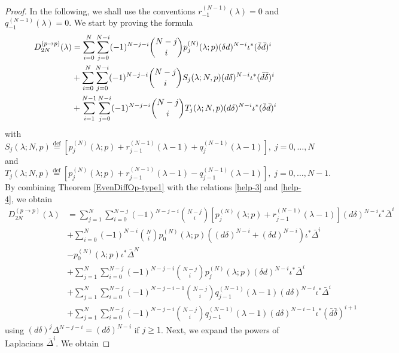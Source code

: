 \documentclass[a4paper,12pt,reqno]{amsart}
\numberwithin{theorem}{subsection}
\numberwithin{equation}{section}
\begin{document}
\begin{proof} In the following, we shall use the conventions $r_{-1}^{(N-1)}(\lambda) = 0$ and
$q_{-1}^{(N-1)}(\lambda)=0$. We start by proving the formula
\begin{align}\label{even-prep}
   D_{2N}^{(p \to p)}(\lambda) & = \sum_{i=0}^{N} \sum_{j=0}^{N-i} (-1)^{N-j-i} \binom{N-j}{i}
   p_j^{(N)}(\lambda;p) (\delta{d})^{N-i} \iota^* (\bar{\delta}\bar{d})^i \notag \\
   & + \sum_{i=0}^{N} \sum_{j=0}^{N-i} (-1)^{N-j-i} \binom{N-j}{i} S_j(\lambda;N,p)
   ({d}\delta)^{N-i} \iota^* (\bar{d}\bar{\delta})^{i} \notag \\
   & + \sum_{i=1}^{N-1} \sum_{j=0}^{N-i} (-1)^{N-j-i} \binom{N-j}{i} T_j(\lambda;N,p)
   ({d}\delta)^{N-i} \iota^* (\bar{\delta}\bar{d})^i
\end{align}
with
$$
   S_j(\lambda;N,p) {\stackrel{\text{def}}{=}} \left[p_j^{(N)}(\lambda;p) + r_{j-1}^{(N-1)}(\lambda\!-\!1)
   + q_j^{(N-1)}(\lambda\!-\!1)\right], \; j=0,\dots,N
$$
and
$$
   T_j(\lambda;N,p) {\stackrel{\text{def}}{=}} \left[p_j^{(N)}(\lambda;p) + r_{j-1}^{(N-1)}(\lambda\!-\!1)
   - q_{j-1}^{(N-1)}(\lambda\!-\!1)\right], \; j=0,\dots,N-1.
$$
By combining Theorem \ref{EvenDiffOp-type1} with the relations \eqref{help-3}
and \eqref{help-4}, we obtain
\begin{align*}
   D_{2N}^{(p \to p)}(\lambda) & = \sum_{j=1}^{N} \sum_{i=0}^{N-j}(-1)^{N-j-i} \binom{N-j}{i}
   \left[ p_j^{(N)}(\lambda;p) + r_{j-1}^{(N-1)}(\lambda\!-\!1) \right]
   ({d} \delta)^{N-i}\iota^*\bar{\Delta}^{i} \\
   & + \sum_{i=0}^N (-1)^{N-i} \binom{N}{i} p_0^{(N)}(\lambda;p)
   \left(({d} \delta)^{N-i} \!+\! (\delta {d})^{N-i}\right) \iota^* \bar{\Delta}^i \\
   & - p_0^{(N)}(\lambda;p) \iota^* \bar{\Delta}^N  \\
   & + \sum_{j=1}^{N} \sum_{i=0}^{N-j} (-1)^{N-j-i} \binom{N-j}{i}
   p_j^{(N)}(\lambda;p) (\delta {d})^{N-i} \iota^*\bar{\Delta}^{i} \\
   & + \sum_{j=1}^{N} \sum_{i=0}^{N-j} (-1)^{N-j-i-1} \binom{N-j}{i}
   q_{j-1}^{(N-1)}(\lambda\!-\!1) ({d} \delta)^{N-i}\iota^*\bar{\Delta}^{i}\\
   & + \sum_{j=1}^{N} \sum_{i=0}^{N-j} (-1)^{N-j-i} \binom{N-j}{i}
   q_{j-1}^{(N-1)}(\lambda\!-\!1) ({d} \delta)^{N-i-1}\iota^* (\bar{d} \bar{\delta})^{i+1}
\end{align*}
using $({d}\delta)^j \Delta^{N-j-i} = ({d}\delta)^{N-i}$ if $j \ge 1$. Next, we
expand the powers of Laplacians $\bar{\Delta}^i$. We obtain

\end{proof}
\end{document}
